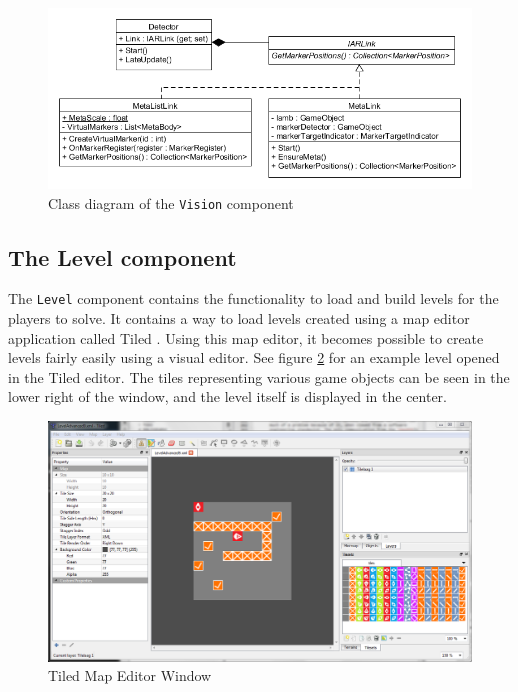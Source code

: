 			\begin{figure}[ht]
				\includegraphics[width=\textwidth]{ClassDiagramVision}
				\caption{Class diagram of the \texttt{Vision} component}
				\label{fig:classdiagramvision}
			\end{figure}
			
		\subsection{The Level component} 
            The \texttt{Level} component contains the functionality to load 
            and build levels for the players to solve. It contains a way to 
            load levels created using a map editor application called 
            Tiled \cite{tiled}. Using this map editor, it becomes possible
            to create levels fairly easily using a visual editor. See figure
            \ref{fig:tilededitor} for an example level opened in the Tiled
            editor. The tiles representing various game objects can be seen in
            the lower right of the window, and the level itself is displayed in
            the center.
            
            \begin{figure}[ht]
                \includegraphics[width=\textwidth]{TiledEditorWindow}
                \caption{Tiled Map Editor Window}
                \label{fig:tilededitor}
            \end{figure}
			
